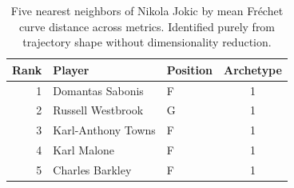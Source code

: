 \begin{table}[htbp]
  \centering\small
  \begin{tabular}{rllc}
    \toprule
    Rank & Player & Position & Archetype \\
    \midrule
    1 & Domantas Sabonis & F & 1 \\
    2 & Russell Westbrook & G & 1 \\
    3 & Karl-Anthony Towns & F & 1 \\
    4 & Karl Malone & F & 1 \\
    5 & Charles Barkley & F & 1 \\
    \bottomrule
  \end{tabular}
  \caption{Five nearest neighbors of Nikola Jokic by mean Fr\'{e}chet curve distance across metrics. Identified purely from trajectory shape without dimensionality reduction.}
  \label{tab:Nikola_Jokic_frechet_curve_neighbors}
\end{table}

